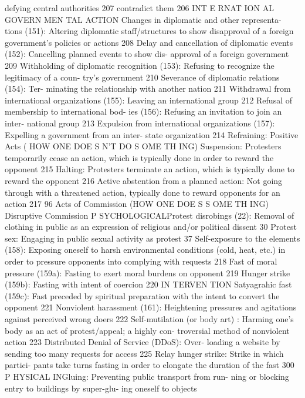 \documentclass[twoside,a4paper,12pt,fleqn,openany]{extbook}
\begin{document}
 defying central authorities
 207
contradict them
 206
INT E RNAT ION AL GOVERN MEN TAL ACTION
Changes in diplomatic and other representa-
tions (151): Altering diplomatic staff/structures
to show disapproval of a foreign government’s
policies or actions
 208
Delay and cancellation of diplomatic events
(152): Cancelling planned events to show dis-
approval of a foreign government
 209
Withholding of diplomatic recognition (153):
Refusing to recognize the legitimacy of a coun-
try’s government
 210
Severance of diplomatic relations (154): Ter-
minating the relationship with another nation		
211
Withdrawal from international organizations
(155): Leaving an international group
 212
Refusal of membership to international bod-
ies (156): Refusing an invitation to join an inter-
national group
 213
Expulsion from international organizations
(157): Expelling a government from an inter-
state organization
 214
Refraining: Positive Acts
( HOW ONE DOE S N’T DO S OME TH ING)
Suspension: Protesters temporarily cease an
action, which is typically done in order to
reward the opponent
 215
Halting: Protesters terminate an action, which
is typically done to reward the opponent 216
Active abstention from a planned action:
Not going through with a threatened action,
typically done to reward opponents for an
action
 217
96
Acts of Commission
(HOW ONE DOE S S OME TH ING)
Disruptive Commission
P SYCHOLOGICALProtest disrobings (22): Removal of clothing
in public as an expression of religious and/or
political dissent
 30
Protest sex: Engaging in public sexual activity
as protest
 37
Self-exposure to the elements (158): Exposing
oneself to harsh environmental conditions
(cold, heat, etc.) in order to pressure opponents
into complying with requests
 218
Fast of moral pressure (159a): Fasting to exert
moral burdens on opponent
 219
Hunger strike (159b): Fasting with intent of
coercion
 220
IN TERVEN TION
Satyagrahic fast (159c): Fast preceded by
spiritual preparation with the intent to convert
the opponent
 221
Nonviolent harassment (161): Heightening
pressures and agitations against perceived
wrong doers
 222
Self-mutilation (or body art) : Harming one’s
body as an act of protest/appeal; a highly con-
troversial method of nonviolent action
 223
Distributed Denial of Service (DDoS): Over-
loading a website by sending too many requests
for access
 225
Relay hunger strike: Strike in which partici-
pants take turns fasting in order to elongate
the duration of the fast
 300
P HYSICAL INGluing: Preventing public transport from run-
ning or blocking entry to buildings by super-glu-
ing oneself to objects
\end{document}
